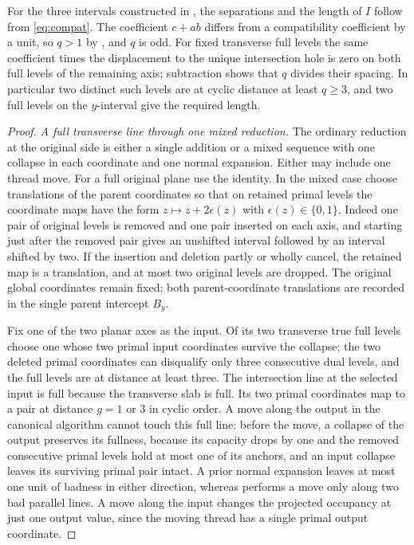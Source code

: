 \documentclass[11pt,colorlinks]{charlie}
\begin{document}
For the three intervals constructed in , the separations and the length of $I$ follow from \eqref{eq:compat}. The coefficient $c+ab$ differs from a compatibility coefficient by a unit, so $q>1$ by \cite[Lemma~13]{BHN}, and $q$ is odd. For fixed transverse full levels the same coefficient times the displacement to the unique intersection hole is zero on both full levels of the remaining axis; subtraction shows that $q$ divides their spacing. In particular two distinct such levels are at cyclic distance at least $q\ge3$, and two full levels on the $y$-interval give the required length.

\begin{proof}
\emph{A full transverse line through one mixed reduction.} The ordinary reduction at the original side is either a single addition or a mixed sequence with one collapse in each coordinate and one normal expansion. Either may include one thread move. For a full original plane use the identity. In the mixed case choose translations of the parent coordinates so that on retained primal levels the coordinate maps have the form $z\mapsto z+2\epsilon(z)$ with $\epsilon(z)\in\{0,1\}$. Indeed one pair of original levels is removed and one pair inserted on each axis, and starting just after the removed pair gives an unshifted interval followed by an interval shifted by two. If the insertion and deletion partly or wholly cancel, the retained map is a translation, and at most two original levels are dropped. The original global coordinates remain fixed; both parent-coordinate translations are recorded in the single parent intercept $B_y$.

Fix one of the two planar axes as the input. Of its two transverse true full levels choose one whose two primal input coordinates survive the collapse; the two deleted primal coordinates can disqualify only three consecutive dual levels, and the full levels are at distance at least three. The intersection line at the selected input is full because the transverse slab is full. Its two primal coordinates map to a pair at distance $g=1$ or $3$ in cyclic order. A move along the output in the canonical algorithm cannot touch this full line: before the move, a collapse of the output preserves its fullness, because its capacity drops by one and the removed consecutive primal levels hold at most one of its anchors, and an input collapse leaves its surviving primal pair intact. A prior normal expansion leaves at most one unit of badness in either direction, whereas \cite[Section~3.2.1]{BHNlong} performs a move only along two bad parallel lines. A move along the input changes the projected occupancy at just one output value, since the moving thread has a single primal output coordinate.


\end{proof}
\end{document}
